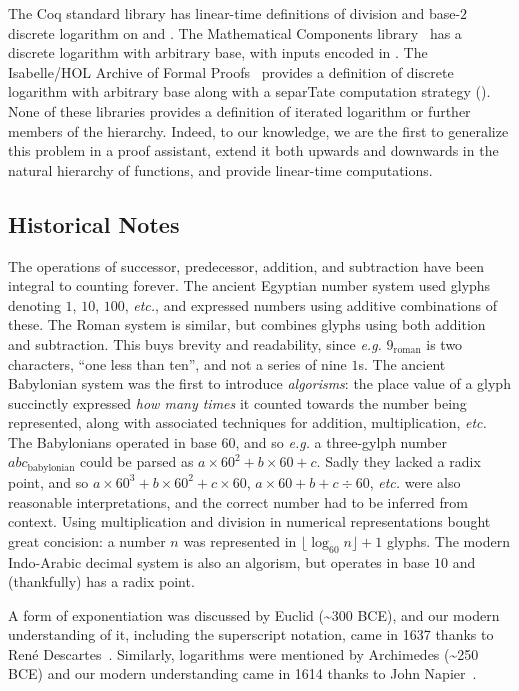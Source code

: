 
%

The Coq standard library has linear-time definitions
of division and base-$2$ discrete logarithm on  and .
The Mathematical Components library~\cite{MathComp}
has a discrete logarithm with arbitrary base, with inputs encoded in .
The Isabelle/HOL Archive of Formal Proofs~\cite{isastan2019} 
provides a definition of discrete logarithm
with arbitrary base along with a separTate computation strategy (\lstset{style=isaStyle}\li{[code]}\lstset{style=myStyle}).
None of these libraries provides a definition of iterated logarithm or
further members of the hierarchy.
Indeed, to our knowledge, we are the first to generalize this
problem in a proof assistant, extend it both
upwards and downwards in the natural hierarchy of functions, and
provide linear-time computations.

\subsection{Historical Notes}
The operations of successor, predecessor, addition, and subtraction have
been integral to counting forever. The ancient Egyptian
number system used glyphs denoting $1$, $10$, $100$, \emph{etc.},
and expressed numbers using additive combinations of these.
The Roman system is similar, but
combines glyphs using both addition and subtraction.
This buys brevity and readability,
since \emph{e.g.} $9_{\text{roman}}$ is two characters, ``one less than ten'',
and not a series of nine $1$s.
The ancient Babylonian system was the first to introduce 
\emph{algorisms}: the place value of a glyph succinctly expressed \emph{how many times} 
it counted towards the number being represented, along with associated techniques for addition, multiplication, \emph{etc.}
The Babylonians operated in
base $60$, and so \emph{e.g.} a three-gylph number $abc_{\text{babylonian}}$ could
be parsed as $a \times 60^2 + b \times 60 + c$. Sadly they lacked
a radix point, and so
$a \times 60^3 + b \times 60^2 + c \times 60$, $a \times 60 + b + c \div 60$,
\emph{etc.} were also reasonable interpretations, and the correct number had
to be inferred from context.
Using multiplication and division in numerical representations bought great concision: a number $n$ was
represented in $\lfloor \log_{60}n \rfloor + 1$ glyphs.
The modern Indo-Arabic decimal system is also an algorism, 
but operates in base $10$ and (thankfully) has a radix point.

A form of exponentiation was discussed by Euclid (\textasciitilde 300 BCE), and our modern
understanding of it, including the superscript notation,
came in 1637 thanks to René Descartes~\cite{descartes}. 
Similarly, logarithms were mentioned by 
Archimedes (\textasciitilde 250 BCE) and our modern understanding came in 1614 thanks to 
John Napier~\cite{napier}.

